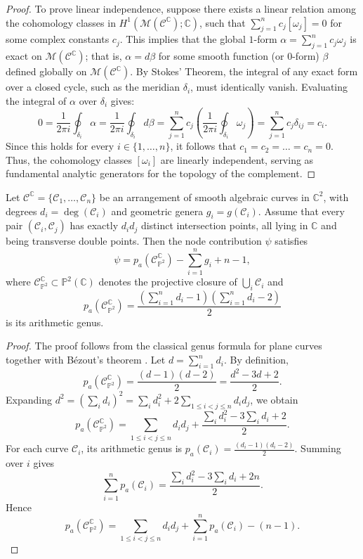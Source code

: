\documentclass[article,11pt]{amsart} \numberwithin{equation}{section}
\numberwithin{equation}{section}
\begin{document}
{\begin{proof}
	To prove linear independence, suppose there exists a linear relation among the cohomology classes in $H^1(\mathcal{M}(\mathcal{C}^\mathbb{C}); \mathbb{C})$, such that $\sum_{j=1}^n c_j [\omega_j] = 0$ for some complex constants $c_j$. This implies that the global $1$-form $\alpha = \sum_{j=1}^n c_j \omega_j$ is exact on $\mathcal{M}(\mathcal{C}^\mathbb{C})$; that is, $\alpha = d\beta$ for some smooth function (or $0$-form) $\beta$ defined globally on $\mathcal{M}(\mathcal{C}^\mathbb{C})$. By Stokes' Theorem, the integral of any exact form over a closed cycle, such as the meridian $\delta_i$, must identically vanish. Evaluating the integral of $\alpha$ over $\delta_i$ gives:
	\[ 0 = \frac{1}{2\pi i} \oint_{\delta_i} \alpha = \frac{1}{2\pi i} \oint_{\delta_i} d\beta = \sum_{j=1}^n c_j \left( \frac{1}{2\pi i} \oint_{\delta_i} \omega_j \right) = \sum_{j=1}^n c_j \delta_{ij} = c_i. \]
	Since this holds for every $i \in \{1, \dots, n\}$, it follows that $c_1 = c_2 = \dots = c_n = 0$. Thus, the cohomology classes $[\omega_i]$ are linearly independent, serving as fundamental analytic generators for the topology of the complement.
\end{proof}

\begin{inp}
	Let $\mathcal{C}^\mathbb{C} = \{\mathscr{C}_1,\dots,\mathscr{C}_n\}$ be an arrangement of smooth algebraic curves in $\mathbb{C}^2$, with degrees $d_i = \deg(\mathscr{C}_i)$ and geometric genera $g_i = g(\mathscr{C}_i)$. Assume that every pair $(\mathscr{C}_i,\mathscr{C}_j)$ has exactly $d_i d_j$ distinct intersection points, all lying in $\mathbb{C}$ and being transverse double points. Then the node contribution $\psi$ satisfies
	\[
	\psi = p_a(\mathcal{C}^\mathbb{C}_{\mathbb{P}^2}) - \sum_{i=1}^n g_i + n - 1,
	\]
	where $\mathcal{C}^\mathbb{C}_{\mathbb{P}^2} \subset \mathbb{P}^2(\mathbb{C})$ denotes the projective closure of $\bigcup_i \mathscr{C}_i$ and
	\[
	p_a(\mathcal{C}^\mathbb{C}_{\mathbb{P}^2}) = \frac{(\sum_{i=1}^n d_i - 1)(\sum_{i=1}^n d_i - 2)}{2}
	\]
	is its arithmetic genus.
\end{inp}

\begin{proof}
	The proof follows from the classical genus formula for plane curves together with Bézout's theorem
	\cite{Fulton,GriffithsHarris,BrieskornKnorrer}.
	Let $d = \sum_{i=1}^n d_i$. By definition,
	\[
	p_a(\mathcal{C}^\mathbb{C}_{\mathbb{P}^2}) = \frac{(d-1)(d-2)}{2}
	= \frac{d^2 - 3d + 2}{2}.
	\]
	Expanding $d^2 = (\sum_i d_i)^2 = \sum_i d_i^2 + 2\sum_{1\le i<j\le n} d_i d_j$, we obtain
	\[
	p_a(\mathcal{C}^\mathbb{C}_{\mathbb{P}^2}) = \sum_{1\le i<j\le n} d_i d_j + \frac{\sum_i d_i^2 - 3\sum_i d_i + 2}{2}.
	\]
	For each curve $\mathscr{C}_i$, its arithmetic genus is $p_a(\mathscr{C}_i) = \frac{(d_i-1)(d_i-2)}{2}$. Summing over $i$ gives
	\[
	\sum_{i=1}^n p_a(\mathscr{C}_i) = \frac{\sum_i d_i^2 - 3\sum_i d_i + 2n}{2}.
	\]
	Hence
	\begin{equation}\label{eq111}
		p_a(\mathcal{C}^\mathbb{C}_{\mathbb{P}^2}) = \sum_{1\le i<j\le n} d_i d_j + \sum_{i=1}^n p_a(\mathscr{C}_i) - (n-1). 
	\end{equation}
	

\end{proof}}
\end{document}

